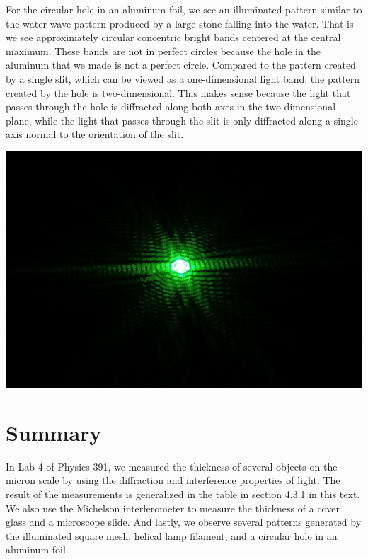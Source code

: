 \documentclass[11pt]{book}
\theoremstyle{break}
\theoremstyle{break}
\begin{document}
For the circular hole in an aluminum foil, we see an illuminated pattern similar to the water wave pattern produced by a large stone falling into the water. That is we see approximately circular concentric bright bands centered at the central maximum. These bands are not in perfect circles because the hole in the aluminum that we made is not a perfect circle. Compared to the pattern created by a single slit, which can be viewed as a one-dimensional light band, the pattern created by the hole is two-dimensional. This makes sense because the light that passes through the hole is diffracted along both axes in the two-dimensional plane, while the light that passes through the slit is only diffracted along a single axis normal to the orientation of the slit. 
\begin{center}
\includegraphics[scale=0.18]{hole.jpg}
\end{center}


\hfill\break
\hfill\break
\section{Summary}
In Lab 4 of Physics 391, we measured the thickness of several objects on the micron scale by using the diffraction and interference properties of light. The result of the measurements is generalized in the table in section 4.3.1 in this text. We also use the Michelson interferometer to measure the thickness of a cover glass and a microscope slide. And lastly, we observe several patterns generated by the illuminated square mesh, helical lamp filament, and a circular hole in an aluminum foil. 
\end{document}

